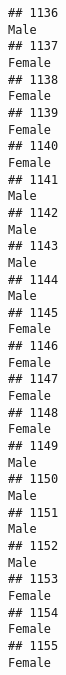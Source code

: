 \documentclass[]{article}
\begin{document}
\begin{verbatim}
## 1136                                                                                                                            Male
## 1137                                                                                                                          Female
## 1138                                                                                                                          Female
## 1139                                                                                                                          Female
## 1140                                                                                                                          Female
## 1141                                                                                                                            Male
## 1142                                                                                                                            Male
## 1143                                                                                                                            Male
## 1144                                                                                                                            Male
## 1145                                                                                                                          Female
## 1146                                                                                                                          Female
## 1147                                                                                                                          Female
## 1148                                                                                                                          Female
## 1149                                                                                                                            Male
## 1150                                                                                                                            Male
## 1151                                                                                                                            Male
## 1152                                                                                                                            Male
## 1153                                                                                                                          Female
## 1154                                                                                                                          Female
## 1155                                                                                                                          Female

\end{verbatim}
\end{document}
